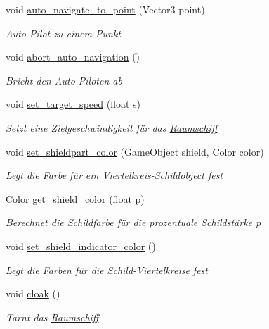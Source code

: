 \begin{DoxyCompactItemize}
void \hyperlink{class_spaceship_a43e9cd085c3e2cdec0122b6f4b3c6456}{auto\+\_\+navigate\+\_\+to\+\_\+point} (Vector3 point)
\begin{DoxyCompactList}\small\item\em Auto-\/\+Pilot zu einem Punkt \end{DoxyCompactList}\item 
void \hyperlink{class_spaceship_a888beaebbb837300c645eb0bc3e979e0}{abort\+\_\+auto\+\_\+navigation} ()
\begin{DoxyCompactList}\small\item\em Bricht den Auto-\/\+Piloten ab \end{DoxyCompactList}\item 
void \hyperlink{class_spaceship_ab0ef968d5442e5d536bcc0d887beacc6}{set\+\_\+target\+\_\+speed} (float s)
\begin{DoxyCompactList}\small\item\em Setzt eine Zielgeschwindigkeit für das \hyperlink{class_raumschiff}{Raumschiff} \end{DoxyCompactList}\item 
void \hyperlink{class_spaceship_a0eaf7f4995770c01eafeabe3a43c2af3}{set\+\_\+shieldpart\+\_\+color} (Game\+Object shield, Color color)
\begin{DoxyCompactList}\small\item\em Legt die Farbe für ein Viertelkreis-\/\+Schildobject fest \end{DoxyCompactList}\item 
Color \hyperlink{class_spaceship_a78e68df6007c48431f1bddf304226948}{get\+\_\+shield\+\_\+color} (float p)
\begin{DoxyCompactList}\small\item\em Berechnet die Schildfarbe für die prozentuale Schildstärke p \end{DoxyCompactList}\item 
void \hyperlink{class_spaceship_ade12946ccbbfffb92a864b710dc2217d}{set\+\_\+shield\+\_\+indicator\+\_\+color} ()
\begin{DoxyCompactList}\small\item\em Legt die Farben für die Schild-\/\+Viertelkreise fest \end{DoxyCompactList}\item 
void \hyperlink{class_spaceship_a06f201982238a71b99c5f065d48c3acc}{cloak} ()
\begin{DoxyCompactList}\small\item\em Tarnt das \hyperlink{class_raumschiff}{Raumschiff} \end{DoxyCompactList}\item 

\end{DoxyCompactItemize}
